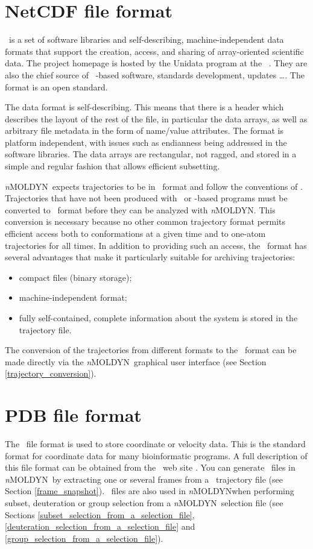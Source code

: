 \documentclass[a4paper,11pt]{report}
\newcommand{\NMOLDYN}{\textit{n}MOLDYN}
\begin{document}
\section{NetCDF file format}
\label{netcdf_file_format}
\NetCDF\ is a set of software libraries and self-describing, machine-independent data formats 
that support the creation, access, and sharing of array-oriented scientific data. The project homepage is hosted by the 
Unidata program at the \UCAR\ \cite{UCAR}. They are also the chief source of \NetCDF\ -based software, standards 
development, updates \ldots \cite{NetCDF_Softwares}. The format is an open standard.

The data format is self-describing. This means that there is a header which describes the layout of the rest of the 
file, in particular the data arrays, as well as arbitrary file metadata in the form of name/value attributes. The format 
is platform independent, with issues such as endianness being addressed in the software libraries. The data arrays 
are rectangular, not ragged, and stored in a simple and regular fashion that allows efficient subsetting.

\NMOLDYN\ expects trajectories to be in \NetCDF\ format and follow the conventions of \MMTK. Trajectories that have not been produced with 
\MMTK\ or \MMTK-based programs must be converted to \MMTK\ format
before they can be analyzed with \NMOLDYN. This conversion is necessary because no other common trajectory format 
permits efficient access both to conformations at a given time and to one-atom trajectories for all times. In
addition to providing such an access, the \NetCDF\ format has several advantages that make it particularly suitable 
for archiving trajectories: 

\begin{itemize}
\item  compact files (binary storage);
\item  machine-independent format;
\item  fully self-contained, complete information about the system is stored in the trajectory file.
\end{itemize}

The conversion of the trajectories from different formats to the \MMTK\ format can be made directly via the 
\NMOLDYN\ graphical user interface (see Section \ref{trajectory_conversion}).

\section{PDB file format}
\label{pdb_file_format}
The \PDB\ file format is used to store coordinate or velocity data. This is the standard format for 
coordinate data for many bioinformatic programs. A full description of this file format can be obtained from the \PDB\ 
web site \cite{PDB}. You can generate \PDB\ files in \NMOLDYN\ by extracting one or several frames from a \MMTK\ 
trajectory file (see Section \ref{frame_snapshot}). \PDB\ files are also used in \NMOLDYN when performing subset, deuteration or group 
selection from a \NMOLDYN\ selection file (see Sections \ref{subset_selection_from_a_selection_file}, 
\ref{deuteration_selection_from_a_selection_file} and \ref{group_selection_from_a_selection_file}).
\end{document}
